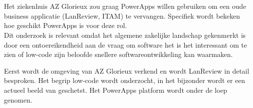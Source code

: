 
%
%

%



\chapter*{}

Het ziekenhuis AZ Glorieux zou graag PowerApps willen gebruiken om een oude business applicatie (LanReview, ITAM) te vervangen. Specifiek wordt bekeken hoe geschikt PowerApps is voor deze rol.\\
Dit onderzoek is relevant omdat het algemene zakelijke landschap gekenmerkt is door een ontoereikendheid aan de vraag om software het is het interessant om te zien of low-code zijn beloofde snellere softwareontwikkeling kan waarmaken. 

Eerst wordt de omgeving van AZ Glorieux verkend en wordt LanReview in detail besproken. Het begrip low-code wordt onderzocht, in het bijzonder wordt er een actueel beeld van geschetst. Het PowerApps platform wordt onder de loep genomen.

